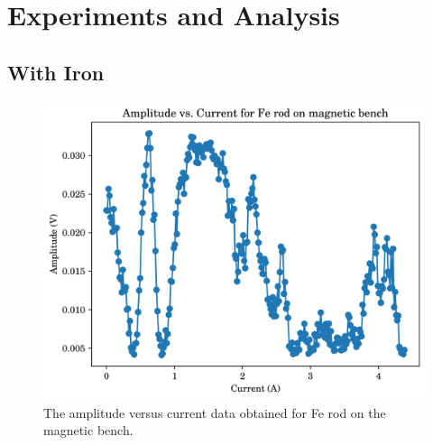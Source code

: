 \chapter{\label{method}Experiments and Analysis}
\section{With Iron}
\begin{figure}[h!]
	\includegraphics{data/mb-Fe-0}
	\caption{The amplitude versus current data obtained for Fe rod on the magnetic bench.}
	\label{fig:mb-fe-0}
\end{figure}
